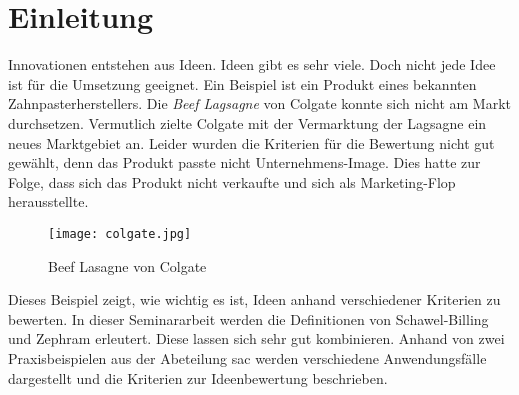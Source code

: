 \section{Einleitung}\label{sec:einleitung}
Innovationen entstehen aus Ideen. Ideen gibt es sehr viele. Doch nicht jede Idee ist für die 
Umsetzung geeignet. Ein Beispiel ist ein Produkt eines bekannten Zahnpasterherstellers. 
Die \textit{Beef Lagsagne} von Colgate konnte sich nicht am Markt durchsetzen. 
Vermutlich zielte Colgate mit der Vermarktung der Lagsagne ein neues Marktgebiet an. 
Leider wurden die Kriterien für die Bewertung nicht gut gewählt, denn das Produkt passte nicht Unternehmens-Image.
Dies hatte zur Folge, dass sich das Produkt nicht verkaufte und sich als Marketing-Flop herausstellte.
\begin{figure}[ht]
	\centering
	\texttt{[image: colgate.jpg]}
	\caption{Beef Lasagne von Colgate}
	\label{img:colgate}
\end{figure}
Dieses Beispiel zeigt, wie wichtig es ist, Ideen anhand verschiedener Kriterien zu bewerten. 
In dieser Seminararbeit werden die Definitionen von Schawel-Billing und Zephram erleutert. Diese lassen sich sehr gut kombinieren. 
Anhand von zwei Praxisbeispielen aus der Abeteilung \ac{sac} werden verschiedene Anwendungsfälle dargestellt und die  
Kriterien zur Ideenbewertung beschrieben. 
